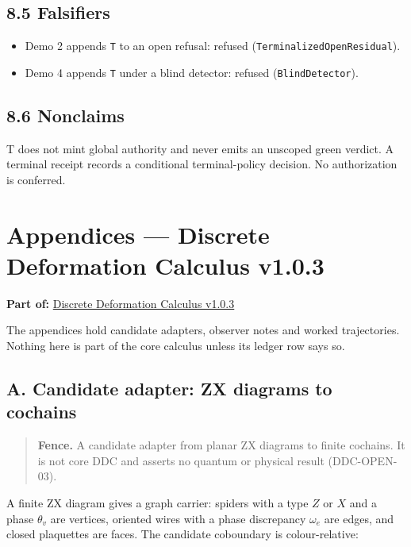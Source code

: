 \documentclass[
  11pt,
]{article}
\providecommand{\tightlist}{%
  \setlength{\itemsep}{0pt}\setlength{\parskip}{0pt}}
\renewcommand{\_}{\ddcunderscore\allowbreak}
\begin{document}
\subsection{8.5 Falsifiers}\label{falsifiers-7}

\begin{itemize}
\tightlist
\item
  Demo 2 appends \texttt{T} to an open refusal: refused
  (\texttt{Terminalized\allowbreak Open\allowbreak Residual}).
\item
  Demo 4 appends \texttt{T} under a blind detector: refused
  (\texttt{Blind\allowbreak Detector}).
\end{itemize}

\subsection{8.6 Nonclaims}\label{nonclaims-7}

T does not mint global authority and never emits an unscoped green
verdict. A terminal receipt records a conditional terminal-policy
decision. No authorization is conferred.

\newpage

\section{Appendices --- Discrete Deformation Calculus
v1.0.3}\label{appendices}

\textbf{Part of:} \hyperref[discrete-deformation-calculus]{Discrete
Deformation Calculus v1.0.3}

The appendices hold candidate adapters, observer notes and worked
trajectories. Nothing here is part of the core calculus unless its
ledger row says so.

\subsection{A. Candidate adapter: ZX diagrams to
cochains}\label{a.-candidate-adapter-zx-diagrams-to-cochains}

\begin{quote}
\textbf{Fence.} A candidate adapter from planar ZX diagrams to finite
cochains. It is not core DDC and asserts no quantum or physical result
(DDC-OPEN-03).
\end{quote}

A finite ZX diagram gives a graph carrier: spiders with a type \(Z\) or
\(X\) and a phase \(\theta_v\) are vertices, oriented wires with a phase
discrepancy \(\omega_e\) are edges, and closed plaquettes are faces. The
candidate coboundary is colour-relative:
\end{document}
